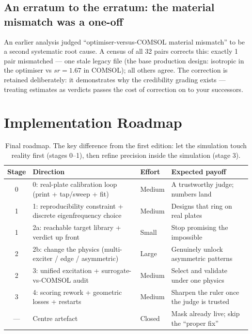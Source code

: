 \documentclass[11pt,a4paper]{article}
\begin{document}
\subsection{An erratum to the erratum: the material mismatch was a one-off}

An earlier analysis judged ``optimiser-versus-COMSOL material mismatch'' to be a second systematic root cause. A census of all 32 pairs corrects this: exactly 1 pair mismatched --- one stale legacy file (the base production design: isotropic in the optimiser vs $sr=1.67$ in COMSOL); all others agree. The correction is retained deliberately: it demonstrates why the credibility grading exists --- treating estimates as verdicts passes the cost of correction on to your successors.

\section{Implementation Roadmap}

\begin{table}[h]
\centering
\small
\begin{tabular}{@{}clll@{}}
\toprule
Stage & Direction & Effort & Expected payoff \\
\midrule
0 & 0: real-plate calibration loop (print + tap/sweep + fit) & Medium & A trustworthy judge; numbers land \\
1 & 1: reproducibility constraint + discrete eigenfrequency choice & Medium & Designs that ring on real plates \\
1 & 2a: reachable target library + verdict up front & Small & Stop promising the impossible \\
2 & 2b: change the physics (multi-exciter / edge / asymmetric) & Large & Genuinely unlock asymmetric patterns \\
2 & 3: unified excitation + surrogate-vs-COMSOL audit & Medium & Select and validate under one physics \\
3 & 4: scoring rework + geometric losses + restarts & Medium & Sharpen the ruler once the judge is trusted \\
--- & Centre artefact & Closed & Mask already live; skip the ``proper fix'' \\
\bottomrule
\end{tabular}
\caption{Final roadmap. The key difference from the first edition: let the simulation touch reality first (stages 0--1), then refine precision inside the simulation (stage 3).}
\end{table}
\end{document}
